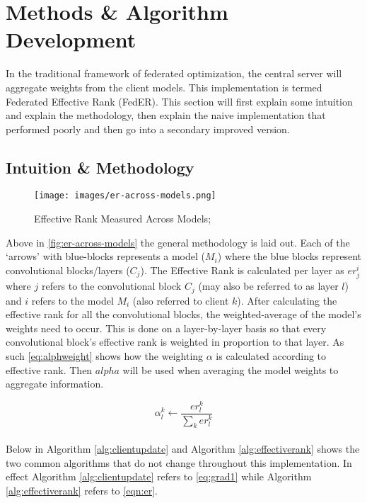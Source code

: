 \chapter{Methods \& Algorithm Development}
In the traditional framework of federated optimization, the central server will aggregate weights from the client models. This implementation is termed Federated Effective Rank (FedER). This section will first explain some intuition and explain the methodology, then explain the naive implementation that performed poorly and then go into a secondary improved version. 
\section{Intuition \& Methodology }

\begin{figure}[H]
    \centering
    \texttt{[image: images/er-across-models.png]}
    \caption{Effective Rank Measured Across Models; }
    \label{fig:er-across-models}
\end{figure}

Above in \autoref{fig:er-across-models} the general methodology is laid out. Each of the `arrows' with blue-blocks represents a model ($M_i$) where the blue blocks represent convolutional blocks/layers ($C_j$). The Effective Rank is calculated per layer as $er_j^i$ where $j$ refers to the convolutional block $C_j$ (may also be referred to as layer $l$) and $i$ refers to the model $M_i$ (also referred to client $k$). After calculating the effective rank for all the convolutional blocks, the weighted-average of the model's weights need to occur. This is done on a layer-by-layer basis so that every convolutional block's effective rank is weighted in proportion to that layer. As such \autoref{eq:alphweight} shows how the weighting $\alpha$ is calculated according to effective rank. Then $alpha$ will be used when averaging the model weights to aggregate information.

\begin{equation}\label{eq:alphweight}
    \alpha_l^k \leftarrow \frac{er_l^k}{\sum_{k} er_l^k} 
\end{equation}
\\
Below in Algorithm \autoref{alg:clientupdate} and Algorithm \autoref{alg:effectiverank} shows the two common algorithms that do not change throughout this implementation. In effect Algorithm \autoref{alg:clientupdate} refers to \autoref{eq:grad1} while Algorithm \autoref{alg:effectiverank} refers to \autoref{eqn:er}.

